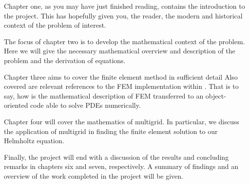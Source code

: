 Chapter one, as you may have just finished reading, contains the introduction to the project.
This has hopefully given you, the reader, the modern and historical context of the problem of interest.

The focus of chapter two is to develop the mathematical context of the problem.
Here we will give the necessary mathematical overview and description of the problem and the derivation of equations.

Chapter three aims to cover the finite element method in sufficient detail 
Also covered are relevant references to the FEM implementation within \oomph.
That is to say, how is the mathematical description of FEM transferred to an object-oriented code able to solve PDEs numerically.

Chapter four will cover the mathematics of multigrid.
In particular, we discuss the application of multigrid in finding the finite element solution to our Helmholtz equation.

Finally, the project will end with a discussion of the results and concluding remarks in chapters six and seven, respectively.
A summary of findings and an overview of the work completed in the project will be given.